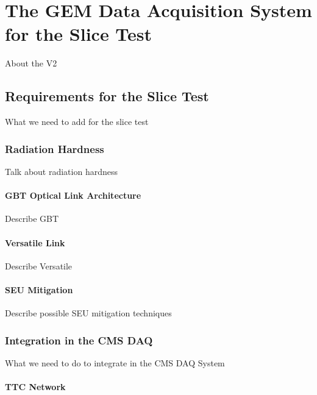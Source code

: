 \chapter{The GEM Data Acquisition System for the Slice Test}
\label{chap:gem_daq_slice_test}

    About the V2

    \section{Requirements for the Slice Test}

        What we need to add for the slice test

        \subsection{Radiation Hardness}

            Talk about radiation hardness

            \subsubsection{GBT Optical Link Architecture}

                Describe GBT

            \subsubsection{Versatile Link}

                Describe Versatile

            \subsubsection{SEU Mitigation}

                Describe possible SEU mitigation techniques

        \subsection{Integration in the CMS DAQ}

            What we need to do to integrate in the CMS DAQ System

            \subsubsection{TTC Network}

